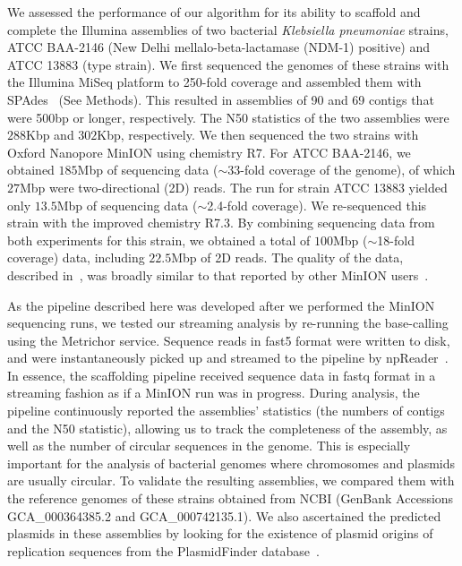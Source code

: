 We assessed the performance of our algorithm for its ability to scaffold and complete the
Illumina assemblies of two bacterial \emph{Klebsiella pneumoniae} strains, ATCC
BAA-2146 (New Delhi mellalo-beta-lactamase (NDM-1) positive)
and ATCC 13883 (type strain).
We first sequenced the genomes of these strains with the Illumina MiSeq platform to 250-fold
coverage and assembled them with SPAdes~\cite{BankevichNA2012}
(See Methods). This resulted in assemblies of 90 and 69 contigs
that were 500bp or longer, respectively. The N50 statistics of the two
assemblies were $288$Kbp and $302$Kbp, respectively.
We then sequenced the two strains with Oxford Nanopore MinION using chemistry R7. 
For ATCC BAA-2146, we obtained $185$Mbp of sequencing data ($\sim$33-fold
coverage of the genome), of which $27$Mbp were two-directional (2D) reads. The run for strain ATCC
13883 yielded only $13.5$Mbp of sequencing data ($\sim$2.4-fold coverage). 
We re-sequenced this strain with the improved chemistry R7.3.
By combining sequencing data from both experiments for this strain, we obtained
a total of $100$Mbp ($\sim$18-fold coverage) data, including $22.5$Mbp of 2D reads.
The quality of the data, described in~\cite{CaoGE2016}, was broadly
similar to that reported by other MinION users~\cite{LomanQ2014, AshtonND2015,
JainFM2015}.

As the pipeline described here was developed after we performed the MinION
sequencing runs, we tested our streaming analysis by re-running the base-calling
using the Metrichor service. Sequence reads in fast5 format were written to disk,
and were instantaneously picked up and streamed to the pipeline by
npReader~\cite{CaoGC2016}. In essence, the scaffolding pipeline received
sequence data in fastq format in a streaming fashion as if a MinION run was
in progress. 
During analysis, the pipeline continuously reported the assemblies'
statistics (the numbers of contigs and the N50 statistic), allowing us to track
the completeness of the assembly, as well as the number of circular sequences in
the genome. This is especially important for the analysis of bacterial genomes
where chromosomes and plasmids are usually circular.
To validate the resulting assemblies, we compared them with the reference
genomes of these strains obtained from NCBI (GenBank Accessions GCA\_000364385.2
and GCA\_000742135.1). We also ascertained the predicted plasmids in these
assemblies by looking for the existence of plasmid origins of replication
sequences from the PlasmidFinder database~\cite{CarattoliZG2014}.


